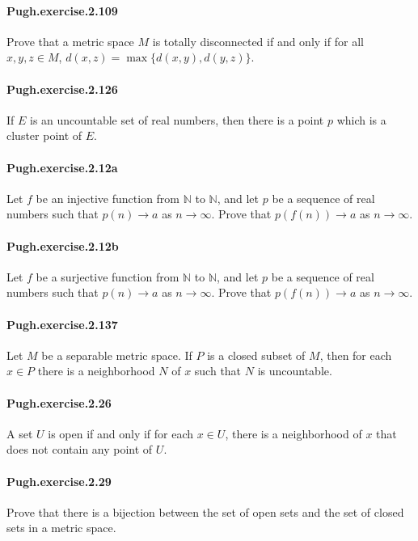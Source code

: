 \documentclass{article}
\begin{document}
\paragraph{Pugh.exercise.2.109} Prove that a metric space $M$ is totally disconnected if and only if for all $x, y, z \in M$, $d(x, z) = \max\{d(x, y), d(y, z)\}$.

\paragraph{Pugh.exercise.2.126} If $E$ is an uncountable set of real numbers, then there is a point $p$ which is a cluster point of $E$.

\paragraph{Pugh.exercise.2.12a} Let $f$ be an injective function from $\mathbb{N}$ to $\mathbb{N}$, and let $p$ be a sequence of real numbers such that $p(n)\to a$ as $n\to\infty$. Prove that $p(f(n))\to a$ as $n\to\infty$.

\paragraph{Pugh.exercise.2.12b} Let $f$ be a surjective function from $\mathbb{N}$ to $\mathbb{N}$, and let $p$ be a sequence of real numbers such that $p(n)\to a$ as $n\to\infty$. Prove that $p(f(n))\to a$ as $n\to\infty$.

\paragraph{Pugh.exercise.2.137} Let $M$ be a separable metric space. If $P$ is a closed subset of $M$, then for each $x\in P$ there is a neighborhood $N$ of $x$ such that $N$ is uncountable.

\paragraph{Pugh.exercise.2.26} A set $U$ is open if and only if for each $x\in U$, there is a neighborhood of $x$ that does not contain any point of $U$.

\paragraph{Pugh.exercise.2.29} Prove that there is a bijection between the set of open sets and the set of closed sets in a metric space.
\end{document}

